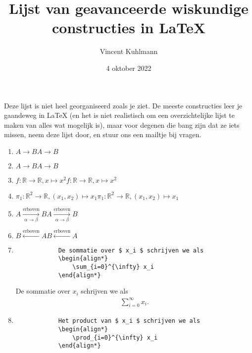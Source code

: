 \documentclass{article}
\title{Lijst van geavanceerde wiskundige constructies in \LaTeX}
\date{4 oktober 2022}
\author{Vincent Kuhlmann}
\newenvironment{demobox}{
    \begin{adjustbox}{frame=1pt 10pt}%
        \begin{minipage}{\linewidth-22pt}
}{
        \end{minipage}
    \end{adjustbox}
}
\begin{document}
    \maketitle

    Deze lijst is niet heel georganiseerd zoals je ziet. De meeste constructies leer je gaandeweg
    in \LaTeX{} (en het is niet realistisch om een overzichtelijke lijst te maken van alles wat mogelijk is), maar voor degenen die bang zijn dat ze iets missen, neem deze lijst door,
    en stuur ons een mailtje bij vragen.

    \begin{enumerate}
        \item \texttt{$ A\rightarrow B $}\qquad $ A\rightarrow B $
        \item \texttt{$ A\to B $}\qquad $ A\to B $
        \item \texttt{$ f: \mathbb{R}\to \mathbb{R}, x\mapsto x^2 $}\qquad $ f: \mathbb{R}\to \mathbb{R}, x\mapsto x^2 $
        \item \texttt{$ \pi_1: \mathbb{R}^2\to \mathbb{R}, (x_1, x_2)\mapsto x_1 $}\qquad $ \pi_1: \mathbb{R}^2\to \mathbb{R}, (x_1, x_2)\mapsto x_1 $
        \item \texttt{$ A\xrightarrow[\alpha\to\beta]{\text{erboven}}B $}\qquad $ A\xrightarrow[\alpha\to\beta]{\text{erboven}}B $
        \item \texttt{$ B\xleftarrow{\text{erboven}} A $}\qquad $ B\xleftarrow{\text{erboven}} A $
        \item \begin{verbatim}
            De sommatie over $ x_i $ schrijven we als
            \begin{align*}
                \sum_{i=0}^{\infty} x_i
            \end{align*}
        \end{verbatim}
        \begin{demobox}
            De sommatie over $ x_i $ schrijven we als
            \begin{align*}
                \sum_{i=0}^{\infty} x_i.
            \end{align*}
        \end{demobox}
        \item \begin{verbatim}
            Het product van $ x_i $ schrijven we als
            \begin{align*}
                \prod_{i=0}^{\infty} x_i
            \end{align*}

\end{verbatim}
\end{enumerate}
\end{document}
